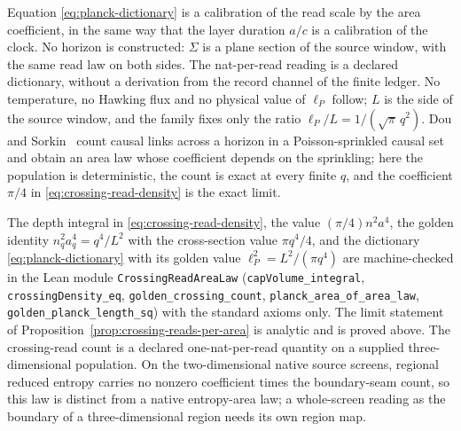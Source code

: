 \begin{remark}
\label{rem:crossing-not-claimed}
Equation \eqref{eq:planck-dictionary} is a calibration of the read scale by
the area coefficient, in the same way that the layer duration $a/c$ is a
calibration of the clock. No horizon is constructed: $\Sigma$ is a plane
section of the source window, with the same read law on both sides. The
nat-per-read reading is a declared dictionary, without a derivation from
the record channel of the finite ledger. No temperature, no Hawking flux
and no physical value of $\ell_P$ follow; $L$ is the side of the source
window, and the family fixes only the ratio $\ell_P/L=1/(\sqrt\pi\,q^2)$.
Dou and Sorkin~\cite{dousorkin2003} count causal links across a horizon in
a Poisson-sprinkled causal set and obtain an area law whose coefficient
depends on the sprinkling; here the population is deterministic, the count
is exact at every finite $q$, and the coefficient $\pi/4$ in
\eqref{eq:crossing-read-density} is the exact limit.
\end{remark}

The depth integral in \eqref{eq:crossing-read-density}, the value
$(\pi/4)n^2a^4$, the golden identity $n_q^2a_q^4=q^4/L^2$ with the
cross-section value $\pi q^4/4$, and the dictionary
\eqref{eq:planck-dictionary} with its golden value $\ell_P^2=L^2/(\pi q^4)$
are machine-checked in the Lean module \texttt{CrossingReadAreaLaw}
(\texttt{capVolume\_integral}, \texttt{crossingDensity\_eq},
\texttt{golden\_crossing\_count}, \texttt{planck\_area\_of\_area\_law},
\texttt{golden\_planck\_length\_sq}) with the standard axioms only. The
limit statement of Proposition~\ref{prop:crossing-reads-per-area} is
analytic and is proved above. The crossing-read count is a declared
one-nat-per-read quantity on a supplied three-dimensional population. On the
two-dimensional native source screens, regional reduced entropy carries no
nonzero coefficient times the boundary-seam count, so this law is distinct
from a native entropy-area law; a whole-screen reading as the boundary of a
three-dimensional region needs its own region map.

